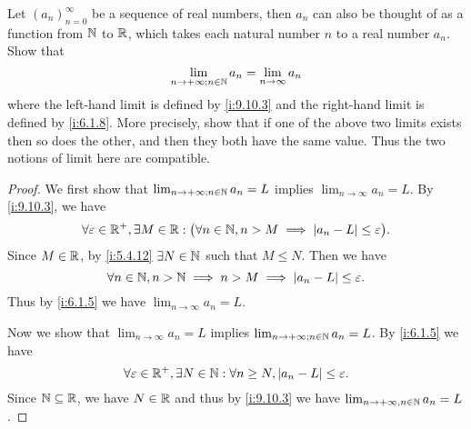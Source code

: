 \exercisesection

\begin{ex}\label{i:ex:9.10.1}
  Let \((a_n)_{n = 0}^\infty\) be a sequence of real numbers, then \(a_n\) can also be thought of as a function from \(\mathbb{N}\) to \(\mathbb{R}\), which takes each natural number \(n\) to a real number \(a_n\).
  Show that
  \[
    \lim_{n \to +\infty ; n \in \mathbb{N}} a_n = \lim_{n \to \infty} a_n
  \]
  where the left-hand limit is defined by \cref{i:9.10.3} and the right-hand limit is defined by \cref{i:6.1.8}.
  More precisely, show that if one of the above two limits exists then so does the other, and then they both have the same value.
  Thus the two notions of limit here are compatible.
\end{ex}

\begin{proof}
  We first show that \(\lim_{n \to +\infty ; n \in \mathbb{N}} a_n = L\) implies \(\lim_{n \to \infty} a_n = L\).
  By \cref{i:9.10.3}, we have
  \[
    \forall \varepsilon \in \mathbb{R}^+, \exists M \in \mathbb{R} : \big(\forall n \in \mathbb{N}, n > M \implies \left\lvert a_n - L\right\rvert \leq \varepsilon\big).
  \]
  Since \(M \in \mathbb{R}\), by \cref{i:5.4.12} \(\exists N \in \mathbb{N}\) such that \(M \leq N\).
  Then we have
  \[
    \forall n \in \mathbb{N}, n > \mathbb{N} \implies n > M \implies \left\lvert a_n - L\right\rvert \leq \varepsilon.
  \]
  Thus by \cref{i:6.1.5} we have \(\lim_{n \to \infty} a_n = L\).

  Now we show that \(\lim_{n \to \infty} a_n = L\) implies \(\lim_{n \to +\infty ; n \in \mathbb{N}} a_n = L\).
  By \cref{i:6.1.5} we have
  \[
    \forall \varepsilon \in \mathbb{R}^+, \exists N \in \mathbb{N} : \forall n \geq N, \left\lvert a_n - L\right\rvert \leq \varepsilon.
  \]
  Since \(\mathbb{N} \subseteq \mathbb{R}\), we have \(N \in \mathbb{R}\) and thus by \cref{i:9.10.3} we have \(\lim_{n \to +\infty, n \in \mathbb{N}} a_n = L\).
\end{proof}
